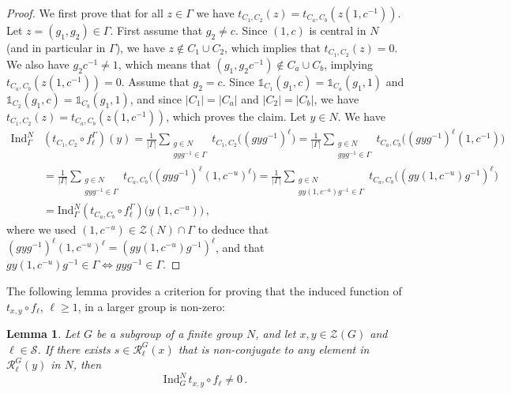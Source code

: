\documentclass[12pt]{amsart}
\numberwithin{equation}{section}
\newtheorem{lem}[X]{Lemma}
\theoremstyle{definition}
\theoremstyle{remark}
\begin{document}
\begin{proof}
    We first prove that for all $z\in \Gamma$ we have $t_{C_1,C_2}(z)=t_{C_a,C_b}(z(1,c^{-1}))$. Let $z=(g_1,g_2)\in \Gamma$. First assume that $g_2\ne c$. Since $(1,c)$ is central in $N$ (and in particular in $\Gamma$), we have $z\notin C_1\cup C_2$, which implies that $t_{C_1,C_2}(z)=0$. We also have $g_2c^{-1}\ne 1$, which means that $(g_1,g_2c^{-1})\notin C_a\cup C_b$, implying $t_{C_a,C_b}(z(1,c^{-1}))=0$. Assume that $g_2=c$. Since $\mathds{1}_{C_1}(g_1,c)=\mathds{1}_{C_a}(g_1,1)$ and $\mathds{1}_{C_2}(g_1,c)=\mathds{1}_{C_b}(g_1,1)$, and since $|C_1|=|C_a|$ and $|C_2|=|C_b|$, we have $t_{C_1,C_2}(z)=t_{C_a,C_b}(z(1,c^{-1}))$, which proves the claim. Let $y\in N$. We have
    \begin{align*}
        \mathrm{Ind}_\Gamma^N&\left(t_{C_1,C_2}\circ f_\ell^\Gamma \right)(y)=\frac{1}{|\Gamma|}\sum_{\substack{g\in N\\ gyg^{-1}\in \Gamma}} t_{C_1,C_2}\bigl( (gyg^{-1})^\ell\bigr)=\frac{1}{|\Gamma|}\sum_{\substack{g\in N\\ gyg^{-1}\in \Gamma}} t_{C_a,C_b}\bigl( (gyg^{-1})^\ell (1,c^{-1})\bigr)\\
        &=\frac{1}{|\Gamma|}\sum_{\substack{g\in N\\ gyg^{-1}\in \Gamma}} t_{C_a,C_b}\bigl( (gyg^{-1})^\ell (1,c^{-u})^\ell\bigr)=
        \frac{1}{|\Gamma|}\sum_{\substack{g\in N\\ gy(1,c^{-u})g^{-1}\in \Gamma}} t_{C_a,C_b}\bigl( (gy(1,c^{-u})g^{-1})^\ell \bigr)\\
        &=\mathrm{Ind}_\Gamma^N\left(t_{C_a,C_b}\circ f_\ell^\Gamma \right)\bigl(y(1,c^{-u})\bigr)\, ,
    \end{align*}
    where we used $(1,c^{-u})\in\mathcal{Z}(N)\cap \Gamma$ to deduce that $(gyg^{-1})^\ell (1,c^{-u})^\ell=(gy(1,c^{-u})g^{-1})^\ell$, and that $gy(1,c^{-u})g^{-1}\in \Gamma\iff gyg^{-1}\in \Gamma $. 
 \end{proof}
 The following lemma provides a criterion for proving that the induced function of $t_{x,y}\circ f_\ell$, $\ell\ge 1$, in a larger group is non-zero:
 \begin{lem}\label{indtx,yne0}
     Let $G$ be a subgroup of a finite group $N$, and let $x,y\in \mathcal{Z}(G)$ and $\ell\in \mathcal{S}$. If there exists $s\in \mathcal{R}_\ell^G(x)$ that is non-conjugate to any element in $\mathcal{R}_\ell^G(y)$ in $N$, then \[\mathrm{Ind}_G^N\, t_{x,y}\circ f_\ell \ne 0\, .\]
 \end{lem}
\end{document}
